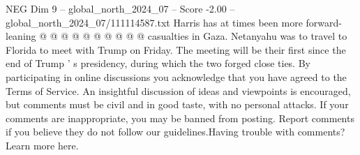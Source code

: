 \begin{textsample}{NEG Dim 9 – global\_north\_2024\_07 – Score -2.00 – global\_north\_2024\_07/111114587.txt}
Harris has at times been more forward-leaning @ @ @ @ @ @ @ @ @ @ casualties in Gaza.
Netanyahu was to travel to Florida to meet with Trump on Friday.
The meeting will be their first since the end of Trump ' s presidency, during which the two forged close ties.
By participating in online discussions you acknowledge that you have agreed to the Terms of Service.
An insightful discussion of ideas and viewpoints is encouraged, but comments must be civil and in good taste, with no personal attacks.
If your comments are inappropriate, you may be banned from posting.
Report comments if you believe they do not follow our guidelines.Having trouble with comments?
Learn more here.

\end{textsample}

